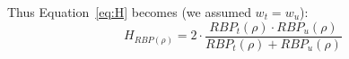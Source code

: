 \noindent Thus Equation~\ref{eq:H} becomes (we assumed $w_t = w_u$):
%
\begin{equation}
 H_{RBP(\rho)} = 2 \cdot \frac{RBP_t(\rho) \cdot RBP_u(\rho)}{RBP_t(\rho) + RBP_u(\rho)}
\label{eq:Hrbp}
\end{equation}




